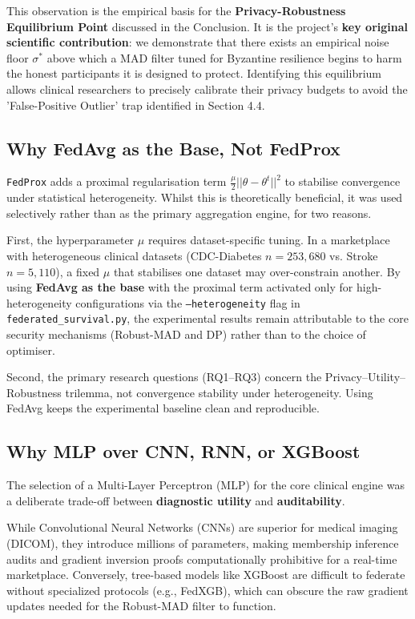 \documentclass[10pt, a4paper, twocolumn]{article}
\begin{document}
This observation is the empirical basis for the \textbf{Privacy-Robustness Equilibrium Point} discussed in the Conclusion. It is the project's \textbf{key original scientific contribution}: we demonstrate that there exists an empirical noise floor $\sigma^*$ above which a MAD filter tuned for Byzantine resilience begins to harm the honest participants it is designed to protect. Identifying this equilibrium allows clinical researchers to precisely calibrate their privacy budgets to avoid the 'False-Positive Outlier' trap identified in Section 4.4.

\subsection{Why FedAvg as the Base, Not FedProx}
\texttt{FedProx} \cite{li2020} adds a proximal regularisation term $\frac{\mu}{2}||\theta - \theta^t||^2$ to stabilise convergence under statistical heterogeneity. Whilst this is theoretically beneficial, it was used selectively rather than as the primary aggregation engine, for two reasons.

First, the hyperparameter $\mu$ requires dataset-specific tuning. In a marketplace with heterogeneous clinical datasets (CDC-Diabetes $n=253,680$ vs. Stroke $n=5,110$), a fixed $\mu$ that stabilises one dataset may over-constrain another. By using \textbf{FedAvg as the base} with the proximal term activated only for high-heterogeneity configurations via the \texttt{--heterogeneity} flag in \texttt{federated\_survival.py}, the experimental results remain attributable to the core security mechanisms (Robust-MAD and DP) rather than to the choice of optimiser.

Second, the primary research questions (RQ1--RQ3) concern the Privacy--Utility--Robustness trilemma, not convergence stability under heterogeneity. Using FedAvg keeps the experimental baseline clean and reproducible.

\subsection{Why MLP over CNN, RNN, or XGBoost}
The selection of a Multi-Layer Perceptron (MLP) for the core clinical engine was a deliberate trade-off between \textbf{diagnostic utility} and \textbf{auditability}. 

While Convolutional Neural Networks (CNNs) are superior for medical imaging (DICOM), they introduce millions of parameters, making membership inference audits and gradient inversion proofs computationally prohibitive for a real-time marketplace. Conversely, tree-based models like XGBoost are difficult to federate without specialized protocols (e.g., FedXGB), which can obscure the raw gradient updates needed for the Robust-MAD filter to function. 
\end{document}
